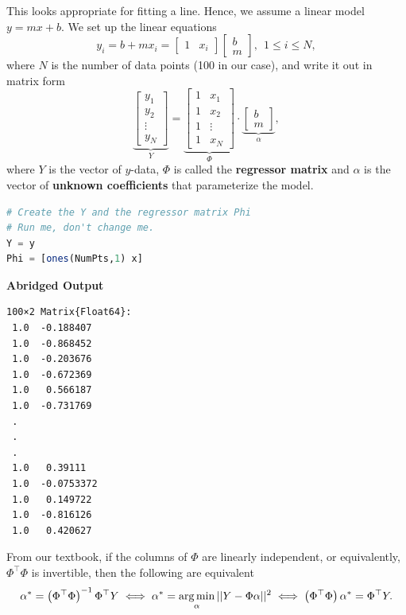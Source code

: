 This looks appropriate for fitting a line. Hence, we assume a linear model ${y}=mx+b$. We set up the linear equations
$$y_i = b + m x_i  = \begin{bmatrix}  1 & x_i  \end{bmatrix} \begin{bmatrix} b \\ m \end{bmatrix},  ~~1 \le i \le N,$$ 
where $N$ is the number of data points (100 in our case), and write it out in matrix form
\begin{equation}
    \label{eq:FirstRegressionModel02}
\underbrace{\begin{bmatrix} y_1 \\ y_2 \\ \vdots \\y_N \end{bmatrix}}_{Y} = \underbrace{\left[\begin{array}{cc}
 1 &   x_1\\
  1 &     x_2  \\
  1 &     \vdots  \\
   1 &    x_N 
\end{array}  \right]}_{\Phi} \cdot  \underbrace{\begin{bmatrix} b \\ m \end{bmatrix}}_{\alpha},
\end{equation}
where $Y$ is the vector of $y$-data, $\Phi$ is called the \textbf{regressor matrix} and $\alpha$ is the vector of \textbf{unknown coefficients} that parameterize the  model.
\begin{lstlisting}[language=Julia,style=mystyle]
# Create the Y and the regressor matrix Phi
# Run me, don't change me.
Y = y
Phi = [ones(NumPts,1) x]
\end{lstlisting}
\textbf{Abridged Output} 
\begin{verbatim}
100×2 Matrix{Float64}:
 1.0  -0.188407
 1.0  -0.868452
 1.0  -0.203676
 1.0  -0.672369
 1.0   0.566187
 1.0  -0.731769
 .
 .
 .
 1.0   0.39111
 1.0  -0.0753372
 1.0   0.149722
 1.0  -0.816126
 1.0   0.420627
\end{verbatim}

\begin{tcolorbox}[title=\textbf{\large Least Squares Fit to Data also called Linear Regression}]

 From our textbook, if the columns of $\Phi$ are linearly independent, or equivalently, $\Phi^\top \Phi$ is invertible, then the following are equivalent 
  \begin{equation}
    \label{eq:ThmLeastSqaredErrorSolution2}
  \alpha^\ast = \left( \Phi^\top \Phi \right)^{-1}\Phi^\top Y  \iff  \alpha^\ast = \operatorname*{arg\,min}_{\alpha} ||Y-\Phi \alpha ||^2 \iff \left( \Phi^\top \Phi \right) \alpha^\ast = \Phi^\top Y.
\end{equation}
  
  \end{tcolorbox}


